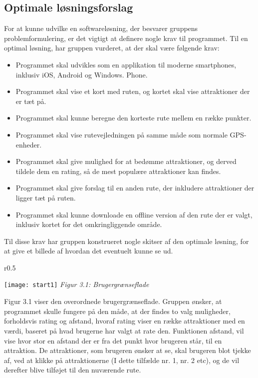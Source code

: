 \subsection{Optimale løsningsforslag}
For at kunne udvilke en softwareløsning, der besvarer gruppens problemformulering, er det vigtigt at definere nogle krav til programmet. Til en optimal løsning, har gruppen vurderet, at der skal være følgende krav:
\begin{itemize}
	\item Programmet skal udvikles som en applikation til moderne smartphones, inklusiv iOS, Android og Windows. Phone. 
	\item Programmet skal vise et kort med ruten, og kortet skal vise attraktioner der er tæt på. 
	\item Programmet skal kunne beregne den korteste rute mellem en række punkter.
	\item Programmet skal vise rutevejledningen på samme måde som normale GPS-enheder. 
	\item Programmet skal give mulighed for at bedømme attraktioner, og derved tildele dem en rating, så de mest populære attraktioner kan findes. 
	\item Programmet skal give forslag til en anden rute, der inkludere attraktioner der ligger tæt på ruten.
	\item Programmet skal kunne  downloade en offline version af den rute der er valgt, inklusiv kortet for det omkringliggende område.
\end{itemize}
Til disse krav har gruppen konstrueret nogle skitser af den optimale løsning, for at give et billede af hvordan det eventuelt kunne se ud. \newline

\begin{wrapfigure}{r}{0.5\textwidth}
  \vspace{-20pt}
  \begin{center}
    \texttt{[image: start1]} \newline
    \textit{Figur 3.1: Brugergrænseflade}\newline
  \end{center}
  \vspace{-20pt}
  \vspace{-10pt}
\end{wrapfigure}


Figur 3.1 viser den overordnede brugergrænseflade. Gruppen ønsker, at programmet skulle fungere på den måde, at der findes to valg muligheder, forholdsvis rating og afstand, hvoraf rating viser en række attraktioner med en værdi, baseret på hvad brugerne har valgt at rate den. Funktionen afstand, vil vise hvor stor en afstand der er fra det punkt hvor brugeren står, til en attraktion. De attraktioner, som brugeren ønsker at se, skal brugeren blot tjekke af, ved at klikke på attraktionerne (I dette tilfælde nr. 1, nr. 2 etc), og de vil derefter blive tilføjet til den nuværende rute. \newline

